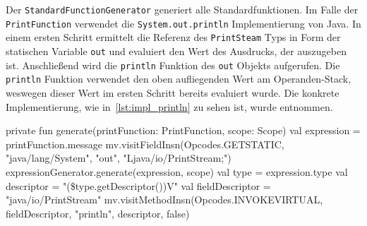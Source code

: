 Der \texttt{StandardFunctionGenerator} generiert alle Standardfunktionen. Im Falle der \texttt{PrintFunction} verwendet \toya die \texttt{System.out.println} Implementierung von Java. In einem ersten Schritt ermittelt \toya die Referenz des \texttt{PrintSteam} Typs in Form der statischen Variable \texttt{out} und evaluiert \toya den Wert des Ausdrucks, der auszugeben ist. Anschließend wird die \texttt{println} Funktion des \texttt{out} Objekts aufgerufen. Die \texttt{println} Funktion verwendet den oben aufliegenden Wert am Operanden-Stack, weswegen dieser Wert im ersten Schritt bereits evaluiert wurde. Die konkrete Implementierung, wie in~\autoref{lst:impl_println} zu sehen ist, wurde \textcite{enkelTutorial} entnommen.

\begin{KotlinCode}[numbers=none, caption={Bytecode zum Aufruf der \texttt{println} Funktion von Java}]
private fun generate(printFunction: PrintFunction, scope: Scope) {
    val expression = printFunction.message
    mv.visitFieldInsn(Opcodes.GETSTATIC, "java/lang/System", "out", "Ljava/io/PrintStream;")
    expressionGenerator.generate(expression, scope)
    val type = expression.type
    val descriptor = "(\${type.getDescriptor()})V"
    val fieldDescriptor = "java/io/PrintStream"
    mv.visitMethodInsn(Opcodes.INVOKEVIRTUAL, fieldDescriptor, "println", descriptor, false)
}
\end{KotlinCode}